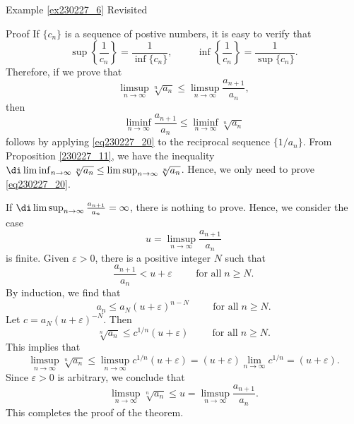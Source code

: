 \begin{example}{\linkt Example \ref{ex230227_6} Revisited}
\begin{example}[label=ex230227_13]{}
\begin{myproof}{Proof}
If $\{c_n\}$ is a sequence of postive numbers,  it is easy to verify that
\[\sup \left\{\frac{1}{c_n}\right\}=\frac{1}{\inf\{c_n\}},\hspace{1cm}\inf \left\{\frac{1}{c_n}\right\}=\frac{1}{\sup\{c_n\}}.\] \bp Therefore, if we prove that
\begin{equation}\label{eq230227_20}\limsup_{n\to\infty}\sqrt[n]{a_n}\leq \limsup_{n\to\infty}\frac{a_{n+1}}{a_n},\end{equation} 
then 
\[\liminf_{n\to\infty}\frac{a_{n+1}}{a_n}\leq\liminf_{n\to\infty}\sqrt[n]{a_n}\] follows by applying \eqref{eq230227_20} to the reciprocal sequence $\{1/a_n\}$. 
From Proposition \ref{230227_11}, we have the inequality $\di \liminf_{n\to\infty}\sqrt[n]{a_n}\leq \limsup_{n\to\infty}\sqrt[n]{a_n}$. 
Hence, we only need to prove  \eqref{eq230227_20}.

 If $\di  \limsup_{n\to\infty}\frac{a_{n+1}}{a_n}=\infty$, there is nothing to prove. Hence, we consider the case
\[u= \limsup_{n\to\infty}\frac{a_{n+1}}{a_n}\] is finite. Given $\varepsilon>0$, there is a positive integer $N$ such that
\[\frac{a_{n+1}}{a_n}<u+ \varepsilon \hspace{1cm}\text{for all}\;n\geq N.\]
By induction, we find that
\[a_n\leq a_N\left(u+ \varepsilon\right)^{n-N}\hspace{1cm}\text{for all}\;n\geq N.\]Let 
$c=a_N(u+\varepsilon)^{-N}$. 
Then 
\[\sqrt[n]{a_n}\leq c^{1/n}(u+\varepsilon)\hspace{1cm}\text{for all}\;n\geq N.\]
This implies that
\[\limsup_{n\to\infty}\sqrt[n]{a_n}\leq \limsup_{n\to\infty}c^{1/n}(u+\varepsilon)=(u+\varepsilon)\lim_{n\to\infty}c^{1/n}=(u+\varepsilon).\]
Since $\varepsilon>0$ is arbitrary, we conclude that
\[\limsup_{n\to\infty}\sqrt[n]{a_n}\leq u= \limsup_{n\to\infty}\frac{a_{n+1}}{a_n}.\]This completes the proof of the theorem.
\end{myproof}


\end{example}
\end{example}
